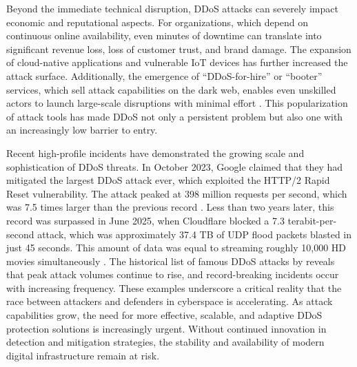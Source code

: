 Beyond the immediate technical disruption, DDoS attacks can severely impact economic and reputational aspects. For organizations, which depend on continuous online availability, even minutes of downtime can translate into significant revenue loss, loss of customer trust, and brand damage. The expansion of cloud-native applications and vulnerable IoT devices has further increased the attack surface. Additionally, the emergence of “DDoS-for-hire” or “booter” services, which sell attack capabilities on the dark web, enables even unskilled actors to launch large-scale disruptions with minimal effort \citep{fbi-ddos}. This popularization of attack tools has made DDoS not only a persistent problem but also one with an increasingly low barrier to entry.

Recent high-profile incidents have demonstrated the growing scale and sophistication of DDoS threats. In October 2023, Google claimed that they had mitigated the largest DDoS attack ever, which exploited the HTTP/2 Rapid Reset vulnerability. The attack peaked at 398 million requests per second, which was 7.5 times larger than the previous record \citep{google-398-mil}. Less than two years later, this record was surpassed in June 2025, when Cloudflare blocked a 7.3 terabit-per-second attack, which was approximately 37.4 TB of UDP flood packets blasted in just 45 seconds. This amount of data was equal to streaming roughly 10,000 HD movies simultaneously \citep{cloudflare-7-3-tbps}. The historical list of famous DDoS attacks by \cite{cloudflare-ddos-list} reveals that peak attack volumes continue to rise, and record-breaking incidents occur with increasing frequency. These examples underscore a critical reality that the race between attackers and defenders in cyberspace is accelerating. As attack capabilities grow, the need for more effective, scalable, and adaptive DDoS protection solutions is increasingly urgent. Without continued innovation in detection and mitigation strategies, the stability and availability of modern digital infrastructure remain at risk.

